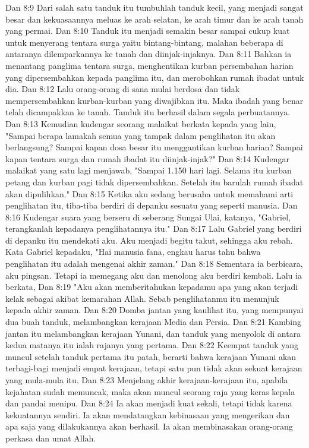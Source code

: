 Dan 8:9  Dari salah satu tanduk itu tumbuhlah tanduk kecil, yang menjadi sangat besar dan kekuasaannya meluas ke arah selatan, ke arah timur dan ke arah tanah yang permai.
Dan 8:10  Tanduk itu menjadi semakin besar sampai cukup kuat untuk menyerang tentara surga yaitu bintang-bintang, malahan beberapa di antaranya dilemparkannya ke tanah dan diinjak-injaknya.
Dan 8:11  Bahkan ia menantang panglima tentara surga, menghentikan kurban persembahan harian yang dipersembahkan kepada panglima itu, dan merobohkan rumah ibadat untuk dia.
Dan 8:12  Lalu orang-orang di sana mulai berdosa dan tidak mempersembahkan kurban-kurban yang diwajibkan itu. Maka ibadah yang benar telah dicampakkan ke tanah. Tanduk itu berhasil dalam segala perbuatannya.
Dan 8:13  Kemudian kudengar seorang malaikat berkata kepada yang lain, "Sampai berapa lamakah semua yang tampak dalam penglihatan itu akan berlangsung? Sampai kapan dosa besar itu menggantikan kurban harian? Sampai kapan tentara surga dan rumah ibadat itu diinjak-injak?"
Dan 8:14  Kudengar malaikat yang satu lagi menjawab, "Sampai 1.150 hari lagi. Selama itu kurban petang dan kurban pagi tidak dipersembahkan. Setelah itu barulah rumah ibadat akan dipulihkan."
Dan 8:15  Ketika aku sedang berusaha untuk memahami arti penglihatan itu, tiba-tiba berdiri di depanku sesuatu yang seperti manusia.
Dan 8:16  Kudengar suara yang berseru di seberang Sungai Ulai, katanya, "Gabriel, terangkanlah kepadanya penglihatannya itu."
Dan 8:17  Lalu Gabriel yang berdiri di depanku itu mendekati aku. Aku menjadi begitu takut, sehingga aku rebah. Kata Gabriel kepadaku, "Hai manusia fana, engkau harus tahu bahwa penglihatan itu adalah mengenai akhir zaman."
Dan 8:18  Sementara ia berbicara, aku pingsan. Tetapi ia memegang aku dan menolong aku berdiri kembali. Lalu ia berkata,
Dan 8:19  "Aku akan memberitahukan kepadamu apa yang akan terjadi kelak sebagai akibat kemarahan Allah. Sebab penglihatanmu itu menunjuk kepada akhir zaman.
Dan 8:20  Domba jantan yang kaulihat itu, yang mempunyai dua buah tanduk, melambangkan kerajaan Media dan Persia.
Dan 8:21  Kambing jantan itu melambangkan kerajaan Yunani, dan tanduk yang menyolok di antara kedua matanya itu ialah rajanya yang pertama.
Dan 8:22  Keempat tanduk yang muncul setelah tanduk pertama itu patah, berarti bahwa kerajaan Yunani akan terbagi-bagi menjadi empat kerajaan, tetapi satu pun tidak akan sekuat kerajaan yang mula-mula itu.
Dan 8:23  Menjelang akhir kerajaan-kerajaan itu, apabila kejahatan sudah memuncak, maka akan muncul seorang raja yang keras kepala dan pandai menipu.
Dan 8:24  Ia akan menjadi kuat sekali, tetapi tidak karena kekuatannya sendiri. Ia akan mendatangkan kebinasaan yang mengerikan dan apa saja yang dilakukannya akan berhasil. Ia akan membinasakan orang-orang perkasa dan umat Allah.
